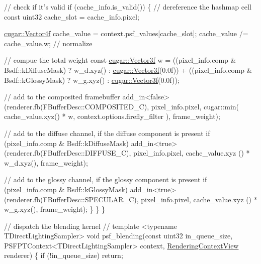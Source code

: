 \begin{DoxyCodeInclude}
            \textcolor{comment}{// check if it's valid}
            \textcolor{keywordflow}{if} (cache\_info.is\_valid())
            \{
                \textcolor{comment}{// dereference the hashmap cell}
                \textcolor{keyword}{const} uint32 cache\_slot = cache\_info.pixel;

                \hyperlink{structcugar_1_1_vector}{cugar::Vector4f} cache\_value = context.psf\_values[cache\_slot];
                                cache\_value /= cache\_value.w; \textcolor{comment}{// normalize}

                \textcolor{comment}{// compue the total weight}
                \textcolor{keyword}{const} \hyperlink{structcugar_1_1_vector}{cugar::Vector3f} w =
                    ((pixel\_info.comp & Bsdf::kDiffuseMask) ? w\_d.xyz() : 
      \hyperlink{structcugar_1_1_vector}{cugar::Vector3f}(0.0f)) +
                    ((pixel\_info.comp & Bsdf::kGlossyMask)  ? w\_g.xyz() : 
      \hyperlink{structcugar_1_1_vector}{cugar::Vector3f}(0.0f));

                \textcolor{comment}{// add to the composited framebuffer}
                add\_in<false>(renderer.fb(FBufferDesc::COMPOSITED\_C), pixel\_info.pixel, cugar::min( 
      cache\_value.xyz() * w, context.options.firefly\_filter ), frame\_weight);

                \textcolor{comment}{// add to the diffuse channel, if the diffuse component is present}
                \textcolor{keywordflow}{if} (pixel\_info.comp & Bsdf::kDiffuseMask)
                    add\_in<true>(renderer.fb(FBufferDesc::DIFFUSE\_C),     pixel\_info.pixel, cache\_value.xyz
      () * w\_d.xyz(), frame\_weight);

                \textcolor{comment}{// add to the glossy channel, if the glossy component is present}
                \textcolor{keywordflow}{if} (pixel\_info.comp & Bsdf::kGlossyMask)
                    add\_in<true>(renderer.fb(FBufferDesc::SPECULAR\_C),    pixel\_info.pixel, cache\_value.xyz
      () * w\_g.xyz(), frame\_weight);
            \}
        \}
    \}

    \textcolor{comment}{// dispatch the blending kernel}
    \textcolor{comment}{//}
    \textcolor{keyword}{template} <\textcolor{keyword}{typename} TDirectLightingSampler>
    \textcolor{keywordtype}{void} psf\_blending(\textcolor{keyword}{const} uint32 in\_queue\_size, PSFPTContext<TDirectLightingSampler> context, 
      \hyperlink{struct_rendering_context_view}{RenderingContextView} renderer)
    \{
        \textcolor{keywordflow}{if} (!in\_queue\_size)
            \textcolor{keywordflow}{return};


\end{DoxyCodeInclude}
